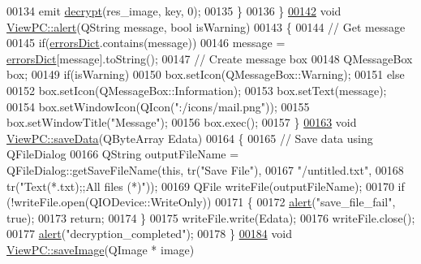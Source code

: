 \begin{DoxyCode}
00134         emit \hyperlink{class_view_p_c_a365df051360d557c7221474ad856e0af}{decrypt}(res\_image, key, 0);
00135     \}
00136 \}
\hypertarget{viewpc_8cpp_source_l00142}{}\hyperlink{class_view_p_c_a7c467169467789561078abc9d4fe57bd}{00142} \textcolor{keywordtype}{void} \hyperlink{class_view_p_c_a7c467169467789561078abc9d4fe57bd}{ViewPC::alert}(QString message, \textcolor{keywordtype}{bool} isWarning)
00143 \{
00144     \textcolor{comment}{// Get message}
00145     \textcolor{keywordflow}{if}(\hyperlink{class_view_p_c_a26f90436aca32e5bad46f5e69a7e7e09}{errorsDict}.contains(message))
00146         message = \hyperlink{class_view_p_c_a26f90436aca32e5bad46f5e69a7e7e09}{errorsDict}[message].toString();
00147     \textcolor{comment}{// Create message box}
00148     QMessageBox box;
00149     \textcolor{keywordflow}{if}(isWarning)
00150         box.setIcon(QMessageBox::Warning);
00151     \textcolor{keywordflow}{else}
00152         box.setIcon(QMessageBox::Information);
00153     box.setText(message);
00154     box.setWindowIcon(QIcon(\textcolor{stringliteral}{":/icons/mail.png"}));
00155     box.setWindowTitle(\textcolor{stringliteral}{"Message"});
00156     box.exec();
00157 \}
\hypertarget{viewpc_8cpp_source_l00163}{}\hyperlink{class_view_p_c_aaff156103970be7c777beedaf0020604}{00163} \textcolor{keywordtype}{void} \hyperlink{class_view_p_c_aaff156103970be7c777beedaf0020604}{ViewPC::saveData}(QByteArray Edata)
00164 \{
00165     \textcolor{comment}{// Save data using QFileDialog}
00166     QString outputFileName = QFileDialog::getSaveFileName(\textcolor{keyword}{this}, tr(\textcolor{stringliteral}{"Save File"}),
00167                                \textcolor{stringliteral}{"/untitled.txt"},
00168                                tr(\textcolor{stringliteral}{"Text(*.txt);;All files (*)"}));
00169     QFile writeFile(outputFileName);
00170     \textcolor{keywordflow}{if} (!writeFile.open(QIODevice::WriteOnly))
00171     \{
00172         \hyperlink{class_view_p_c_a7c467169467789561078abc9d4fe57bd}{alert}(\textcolor{stringliteral}{"save\_file\_fail"}, \textcolor{keyword}{true});
00173         \textcolor{keywordflow}{return};
00174     \}
00175     writeFile.write(Edata);
00176     writeFile.close();
00177     \hyperlink{class_view_p_c_a7c467169467789561078abc9d4fe57bd}{alert}(\textcolor{stringliteral}{"decryption\_completed"});
00178 \}
\hypertarget{viewpc_8cpp_source_l00184}{}\hyperlink{class_view_p_c_a7901ce10ffaaf2387bef1db7feea342d}{00184} \textcolor{keywordtype}{void} \hyperlink{class_view_p_c_a7901ce10ffaaf2387bef1db7feea342d}{ViewPC::saveImage}(QImage * image)

\end{DoxyCode}

